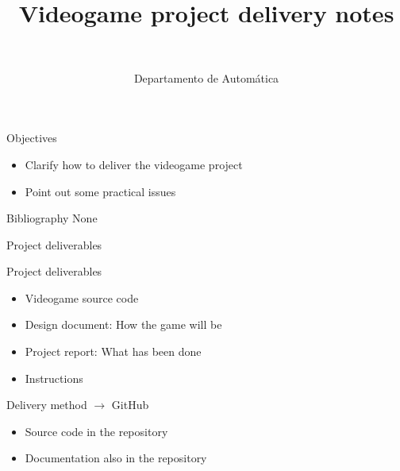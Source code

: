 \documentclass[10pt,compress]{beamer} %
\title[Videogame delivery notes]{Videogame project delivery notes}
\author{\asignatura\\\carrera}
\institute{}
\date{Departamento de Automática}
\begin{document}
{\titlepageBlue
    \begin{frame}
        \titlepage
    \end{frame}
}

\begin{frame}[plain]{}
   \begin{block}{Objectives}
   \begin{itemize}
        \item Clarify how to deliver the videogame project
		\item Point out some practical issues
	\end{itemize}
	\end{block}

   \begin{block}{Bibliography}
   		None
   \end{block}
\end{frame}



\begin{frame}{Project deliverables}
	\begin{block}{Project deliverables}
	\begin{itemize}
	\item Videogame source code
	\item Design document: How the game will be
	\item Project report: What has been done
    \item Instructions
	\end{itemize}
	\end{block}

	\bigskip
	
	Delivery method $\rightarrow$ GitHub
	\begin{itemize}
	\item Source code in the repository
	\item Documentation also in the repository
	\end{itemize}
\end{frame}
\end{document}
